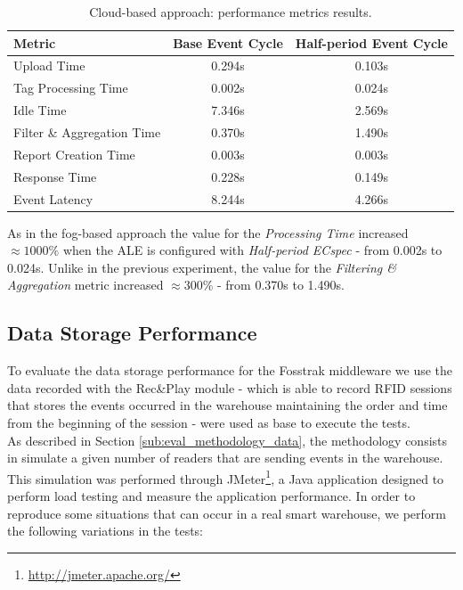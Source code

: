 \begin{table}[ht!]
  \centering
    \begin{tabular}{|l|c|c|}
    \hline
    Metric                     & Base Event Cycle & Half-period Event Cycle \\ \hline
    Upload Time                & 0.294s           & 0.103s                  \\ \hline
    Tag Processing Time        & 0.002s           & 0.024s                  \\ \hline
    Idle Time                  & 7.346s           & 2.569s                  \\ \hline
    Filter \& Aggregation Time & 0.370s           & 1.490s                  \\ \hline
    Report Creation Time       & 0.003s           & 0.003s                  \\ \hline
    Response Time              & 0.228s           & 0.149s                  \\ \hline
    Event Latency              & 8.244s           & 4.266s                  \\ \hline
    \end{tabular}
  \caption[Cloud-based approach: performance results.]{Cloud-based approach: performance metrics results.}
  \label{table:cloud_metrics}
\end{table}

As in the fog-based approach the value for the \textit{Processing Time} increased $\approx1000\%$ when
the \gls{ALE} is configured with \textit{Half-period ECspec} - from 0.002s to 0.024s. Unlike in the
previous experiment, the value for the \textit{Filtering \& Aggregation} metric increased $\approx300\%$
- from 0.370s to 1.490s.

\subsection{Data Storage Performance}
\label{sub:eval_exp_data}
To evaluate the data storage performance for the Fosstrak middleware we use the data recorded with the Rec\&Play
module - which is able to record \gls{RFID} sessions that stores the events occurred in the warehouse
maintaining the order and time from the beginning of the session - were used as base to execute
the tests.\\

As described in Section \ref{sub:eval_methodology_data}, the methodology consists in simulate a given
number of readers that are sending events in the warehouse. This simulation was performed through JMeter\footnote{\url{http://jmeter.apache.org/}},
a Java application designed to perform load testing and measure the application performance.
In order to reproduce some situations that can occur in a real smart warehouse, we perform the following
variations in the tests:


